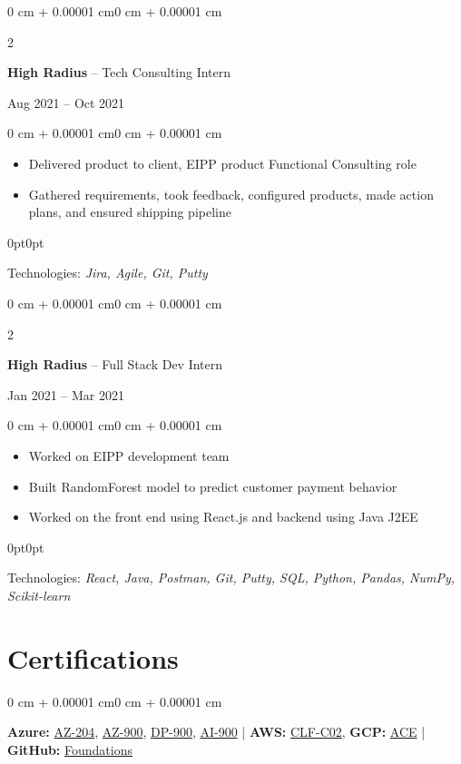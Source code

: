 \documentclass[10pt, letterpaper]{article}
\newenvironment{highlights}{
    \begin{itemize}[
        topsep=0.10 cm, parsep=0.10 cm, partopsep=0pt, itemsep=0pt,
        leftmargin=0 cm + 10pt
    ]
}{
    \end{itemize}
}
\newenvironment{techline}{
    \begin{adjustwidth}{0pt}{0pt}
    \vspace{0.05cm}
}{
    \vspace{0.05cm}
    \end{adjustwidth}
}
\newenvironment{onecolentry}{
    \begin{adjustwidth}{0 cm + 0.00001 cm}{0 cm + 0.00001 cm}
}{
    \end{adjustwidth}
}
\newenvironment{twocolentry}[2][]{
    \onecolentry
    \def\secondColumn{#2}
    \setcolumnwidth{\fill, 4.5 cm}
    \begin{paracol}{2}
}{
    \switchcolumn \raggedleft \secondColumn
    \end{paracol}
    \endonecolentry
}
\begin{document}
\vspace{0.2 cm}

\begin{twocolentry}{Aug 2021 – Oct 2021}
    \textbf{High Radius} -- Tech Consulting Intern
\end{twocolentry}
\begin{onecolentry}
    \begin{highlights}
        \item Delivered product to client, EIPP product Functional Consulting role
        \item Gathered requirements, took feedback, configured products, made action plans, and ensured shipping pipeline
    \end{highlights}
    \begin{techline}
        Technologies: \textit{Jira, Agile, Git, Putty}
    \end{techline}
\end{onecolentry}

\vspace{0.2 cm}

\begin{twocolentry}{Jan 2021 – Mar 2021}
    \textbf{High Radius} -- Full Stack Dev Intern
\end{twocolentry}
\begin{onecolentry}
    \begin{highlights}
        \item Worked on EIPP development team
        \item Built RandomForest model to predict customer payment behavior
        \item Worked on the front end using React.js and backend using Java J2EE
    \end{highlights}
    \begin{techline}
        Technologies: \textit{React, Java, Postman, Git, Putty, SQL, Python, Pandas, NumPy, Scikit-learn}
    \end{techline}
\end{onecolentry}

\section{Certifications}
\begin{onecolentry}
    \textbf{Azure:} \href{https://learn.microsoft.com/api/credentials/share/en-us/Hritthikb/7FD3A0745F0FDBA9?sharingId=F7DBE96854C9D653}{AZ-204}, \href{https://learn.microsoft.com/api/credentials/share/en-us/Hritthikb/C672042C9602BACA?sharingId=F7DBE96854C9D653}{AZ-900}, \href{https://learn.microsoft.com/api/credentials/share/en-us/Hritthikb/ADE7CF32DC0229C3?sharingId=F7DBE96854C9D653}{DP-900}, \href{https://learn.microsoft.com/api/credentials/share/en-us/Hritthikb/29C57AE56C8740F9?sharingId=F7DBE96854C9D653}{AI-900} | 
    \textbf{AWS: }\href{https://drive.google.com/file/d/19zyEZdZxfMfxBnFuyHEbPhX_mwNOj6UJ/view}{CLF-C02}, 
    \textbf{GCP: }\href{https://www.credly.com/badges/861ee3af-84e2-4c7c-89cc-2fa0cd059729/public_url}{ACE} | \textbf{GitHub: } \href{https://www.credly.com/go/9i9Jv75B}{Foundations}
\end{onecolentry}
\end{document}
